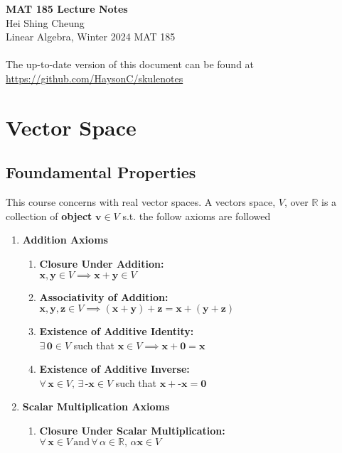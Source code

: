 \documentclass[11pt]{article}
\begin{document}
\thispagestyle{empty}
{\LARGE \bf MAT 185 Lecture Notes}\\
{\large Hei Shing Cheung}\\
Linear Algebra, Winter 2024 \hfill MAT 185\\
\\
The up-to-date version of this document can be found at \url{https://github.com/HaysonC/skulenotes}\\
\section{Vector Space}
\subsection{Foundamental Properties}
\begin{definition}
    This course concerns with real vector spaces. A vectors space, ${V}$, over $\mathbb{R}$ is a collection of \textbf{object} $\textbf{v} \in V$ s.t. the follow axioms are followed
    \begin{enumerate}
        \item \textbf{Addition Axioms}
        \begin{enumerate}
            \item \textbf{Closure Under Addition:} \\
            $\textbf{x}, \textbf{y} \in V \implies \textbf{x} + \textbf{y} \in V$
            
            \item \textbf{Associativity of Addition:} \\
            $\textbf{x}, \textbf{y}, \textbf{z} \in V \implies (\textbf{x} + \textbf{y}) + \textbf{z} = \textbf{x} + (\textbf{y} + \textbf{z})$
            
            \item \textbf{Existence of Additive Identity:} \\
            $\exists \, \textbf{0} \in V$ such that $\textbf{x} \in V \implies \textbf{x} + \textbf{0} = \textbf{x}$
            
            \item \textbf{Existence of Additive Inverse:} \\
            $\forall \, \textbf{x} \in V, \, \exists \, \textbf{-x} \in V$ such that $\textbf{x} + \textbf{-x} = \textbf{0}$
        \end{enumerate}
        
        \item \textbf{Scalar Multiplication Axioms}
        \begin{enumerate}
            \item \textbf{Closure Under Scalar Multiplication:} \\
            $\forall \, \textbf{x} \in V \, \text{and} \, \forall \, \alpha \in \mathbb{R}, \, \alpha \textbf{x} \in V$
            

\end{enumerate}
\end{enumerate}
\end{definition}
\end{document}
